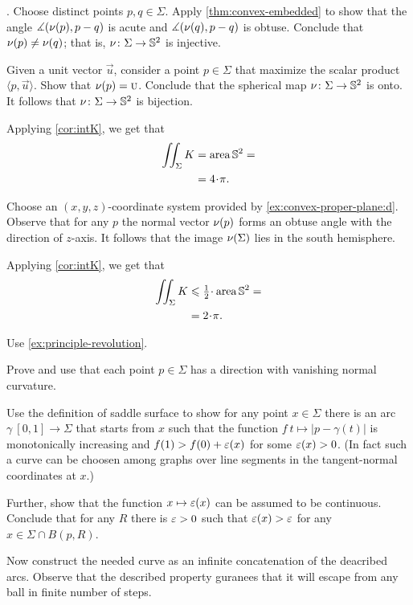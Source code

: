\parbf{\ref{ex:intK}}.
Choose distinct points $p,q\in\Sigma$.
Apply \ref{thm:convex-embedded} to show that the angle 
$\measuredangle(\nu(p),p-q)$ is acute and $\measuredangle(\nu(q),p-q)$ is obtuse.
Conclude that $\nu(p)\ne\nu(q)$;
that is, $\nu\colon\Sigma\to\mathbb{S}^2$ is injective.


Given a unit vector $\vec u$, consider a point $p\in \Sigma$ that maximize the scalar product $\langle p,\vec u\rangle$.
Show that $\nu(p)=\textsc u$.
Conclude that the spherical map $\nu\colon\Sigma\to\mathbb{S}^2$ is onto.
It follows that $\nu\colon\Sigma\to\mathbb{S}^2$ is bijection.

Applying \ref{cor:intK}, we get that 
\begin{align*}
\iint_\Sigma K&=\area\mathbb{S}^2=
\\
&=4\cdot\pi.
\end{align*}

 Choose an $(x,y,z)$-coordinate system provided by \ref{ex:convex-proper-plane:d}.
Observe that for any $p$ the normal vector $\nu(p)$ forms an obtuse angle with the direction of $z$-axis.
It follows that the image $\nu(\Sigma)$ lies in the south hemisphere.

Applying \ref{cor:intK}, we get that 
\begin{align*}
\iint_\Sigma K&\le \tfrac12\cdot\area\mathbb{S}^2=
\\
&=2\cdot\pi.
\end{align*}

 Use \ref{ex:principle-revolution}.

 Prove and use that each point $p\in\Sigma$ has a direction with vanishing normal curvature.

Use the definition of saddle surface to show for any point $x\in\Sigma$ there is an arc $\gamma\:[0,1]\to\Sigma$ that starts from $x$ such that 
the function $f\:t\mapsto |p-\gamma(t)|$ is monotonically increasing and $f(1)>f(0)+\varepsilon(x)$ for some $\varepsilon(x)>0$.
(In fact such a curve can be choosen among graphs over line segments in the tangent-normal coordinates at $x$.)

Further, show that the function $x\mapsto\varepsilon(x)$ can be assumed to be continuous.
Conclude that for any $R$ there is $\varepsilon>0$ such that $\varepsilon(x)>\varepsilon$ for any $x\in\Sigma\cap B(p,R)$.

Now construct the needed curve as an infinite concatenation of the deacribed arcs.
Observe that the described property guranees that it will escape from any ball in finite number of steps.


